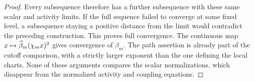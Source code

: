\begin{proof}
Every subsequence therefore has a further subsequence with these same scalar and activity limits. If the full sequence failed to converge at some fixed level, a subsequence staying a positive distance from the limit would contradict the preceding construction. This proves full convergence. The continuous map $x\mapsto\widehat{\beta}_m(\chi_mx)^2$ gives convergence of $\beta_m$. The path assertion is already part of the cutoff comparison, with a strictly larger exponent than the one defining the local charts. None of these arguments compares the scalar normalizations, which disappear from the normalized activity and coupling equations.
\end{proof}

